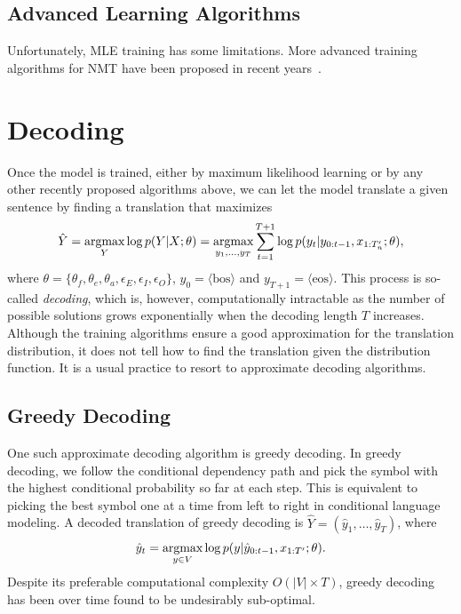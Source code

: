\subsection{Advanced Learning Algorithms}
Unfortunately, MLE training has some limitations. More advanced training algorithms for NMT have been proposed in recent years~\citep{wiseman2016sequence,shen2015minimum,bahdanau2016actor,ranzato2015sequence}.


\section{Decoding}
Once the model is trained, either by maximum likelihood learning or by any other recently proposed algorithms above, we can let the model translate a given sentence by finding a translation that maximizes 
\begin{equation}
\hat{Y} = \mathop{\text{argmax}}_{Y} \log p(Y|X; \theta) =\mathop{\text{argmax}}_{y_1, ..., y_T}\sum_{t=1}^{T+1} \log p(y_t| y_{0:t-1}, x_{1:T'_n}; \theta),
\end{equation}
where $\theta=\{\theta_f, \theta_e, \theta_a, \epsilon_E, \epsilon_I, \epsilon_O \}$, $y_0 = \langle \mathrm{bos}\rangle$ and $y_{T+1} = \langle \mathrm{eos}\rangle$. This process is so-called \textit{decoding}, which is, however, computationally intractable as the number of possible solutions grows exponentially when the decoding length $T$ increases. Although the training algorithms ensure a good approximation for the translation distribution, it does not tell how to find the translation given the distribution function. It is a usual practice to resort to approximate decoding algorithms.

\subsection{Greedy Decoding}

One such approximate decoding algorithm is greedy decoding. In greedy decoding, we follow the conditional dependency path and pick the symbol with the highest conditional probability so far at each step. This is equivalent to picking the best symbol one at a time from left to right in conditional language modeling. A decoded translation of greedy decoding is $\hat{Y} = (\hat{y}_1, \ldots, \hat{y}_T)$, where
\begin{equation}
\hat{y}_t =  \mathop{\text{argmax}}_{y \in V} \log p(y|\hat{y}_{0:t-1}, x_{1:T'}; \theta).
\end{equation}
Despite its preferable computational complexity $O(|V| \times T)$, greedy decoding has been over time found to be undesirably sub-optimal.%

